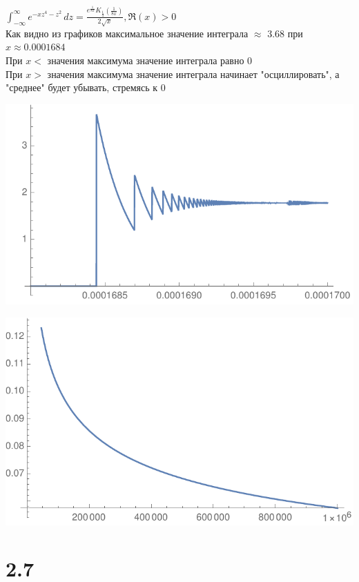 \documentclass[a4paper,14pt]{article}
\begin{document}
$\int_{-\infty }^{\infty } e^{-x z^4-z^2} \, dz = \frac{e^{\frac{1}{8 x}} K_{\frac{1}{4}}\left(\frac{1}{8 x}\right)}{2 \sqrt{x}},\Re(x)>0$\\

Как видно из графиков максимальное значение интеграла $\approx$ 3.68 при $x\approx 0.0001684$\\
При $x<$ значения максимума значение интеграла равно 0\\
При $x>$ значения максимума значение интеграла начинает "осциллировать", а "среднее" будет убывать, стремясь к 0

\begin{center}
\includegraphics{gr4}
\end{center}

\begin{center}
\includegraphics{gr5}
\end{center}

\section*{2.7}
\end{document}
